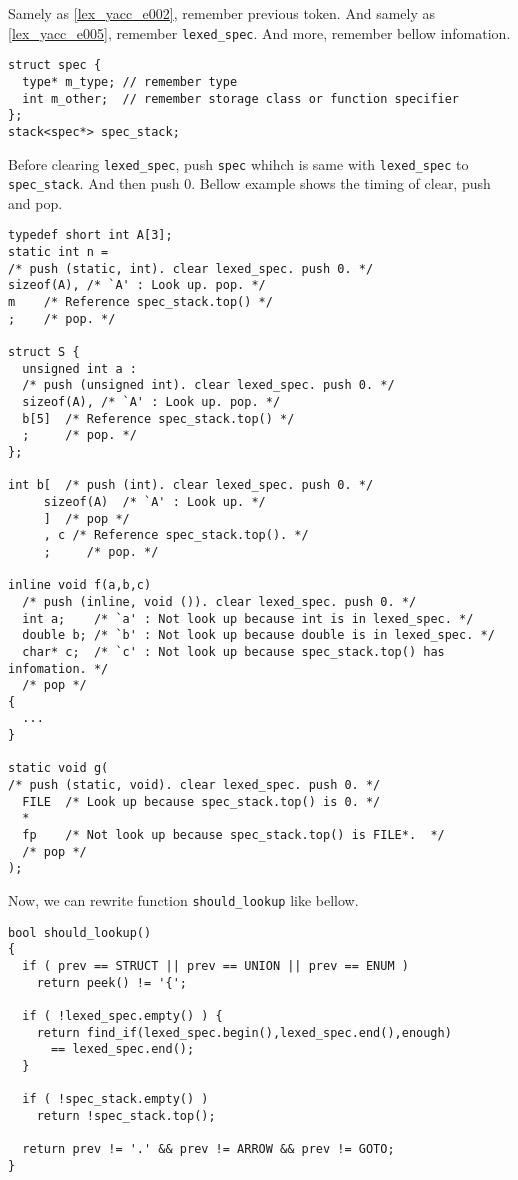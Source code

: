 \begin{Method}
\label{lex_yacc_e006}
Samely as \ref{lex_yacc_e002}, remember previous token.
And samely as \ref{lex_yacc_e005}, remember {\tt{lexed\_spec}}.
And more, remember bellow infomation.
\begin{verbatim}
struct spec {
  type* m_type; // remember type
  int m_other;  // remember storage class or function specifier
};
stack<spec*> spec_stack;
\end{verbatim}
Before clearing {\tt{lexed\_spec}}, 
push {\tt{spec}} whihch is same with {\tt{lexed\_spec}}
to {\tt{spec\_stack}}.
And then push 0.
Bellow example shows the timing of clear, push and pop.

\begin{verbatim}
typedef short int A[3];
static int n =
/* push (static, int). clear lexed_spec. push 0. */
sizeof(A), /* `A' : Look up. pop. */
m    /* Reference spec_stack.top() */
;    /* pop. */

struct S {
  unsigned int a :
  /* push (unsigned int). clear lexed_spec. push 0. */
  sizeof(A), /* `A' : Look up. pop. */
  b[5]  /* Reference spec_stack.top() */
  ;     /* pop. */
};

int b[  /* push (int). clear lexed_spec. push 0. */
     sizeof(A)  /* `A' : Look up. */
     ]  /* pop */
     , c /* Reference spec_stack.top(). */
     ;     /* pop. */

inline void f(a,b,c)
  /* push (inline, void ()). clear lexed_spec. push 0. */
  int a;    /* `a' : Not look up because int is in lexed_spec. */
  double b; /* `b' : Not look up because double is in lexed_spec. */
  char* c;  /* `c' : Not look up because spec_stack.top() has infomation. */
  /* pop */
{
  ...
}

static void g(
/* push (static, void). clear lexed_spec. push 0. */
  FILE  /* Look up because spec_stack.top() is 0. */
  *
  fp    /* Not look up because spec_stack.top() is FILE*.  */
  /* pop */
);
\end{verbatim}

Now, we can rewrite function {\tt{should\_lookup}} like bellow.
\begin{verbatim}
bool should_lookup()
{
  if ( prev == STRUCT || prev == UNION || prev == ENUM )
    return peek() != '{';

  if ( !lexed_spec.empty() ) {
    return find_if(lexed_spec.begin(),lexed_spec.end(),enough)
      == lexed_spec.end();
  }

  if ( !spec_stack.empty() )
    return !spec_stack.top();

  return prev != '.' && prev != ARROW && prev != GOTO;
}
\end{verbatim}
\end{Method}

